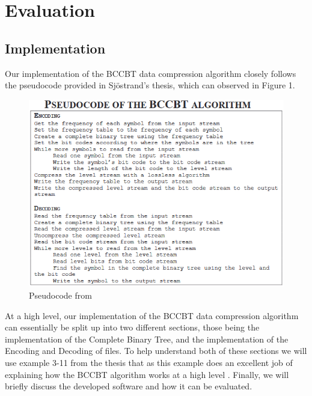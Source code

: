 \documentclass[12pt]{IEEEtran}
\begin{document}
\section{Evaluation}

\subsection{Implementation}
Our implementation of the BCCBT data compression algorithm closely follows the pseudocode provided in Sjöstrand's thesis,
which can observed in Figure 1.
\begin{figure}[h]
\centering
\includegraphics[scale=0.55]{../presentation/images/pseudocode.PNG}
\caption{Pseudocode from \cite{Sjostrand}}
\end{figure}
At a high level, our implementation of the BCCBT data compression algorithm can essentially be split up into two different sections,
those being the implementation of the Complete Binary Tree, and the implementation of the Encoding and Decoding of files.
To help understand both of these sections we will use example 3-11 from the thesis that as this example does an excellent job of explaining
how the BCCBT algorithm works at a high level \cite{Sjostrand}.
Finally, we will briefly discuss the developed software and how it can be evaluated.
\end{document}
